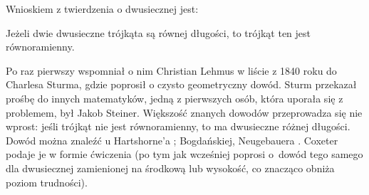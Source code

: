 %

Wnioskiem z twierdzenia o dwusiecznej jest:

\begin{theorem}
    \label{theorem_steiner_lehmus}%
	Jeżeli dwie dwusieczne trójkąta są równej długości, to trójkąt ten jest równoramienny.
\end{theorem}

Po raz pierwszy wspomniał o nim Christian Lehmus w liście z 1840 roku do Charlesa Sturma, gdzie poprosił o czysto geometryczny dowód.
%
%
Sturm przekazał prośbę do innych matematyków, jedną z pierwszych osób, która uporała się z problemem, był Jakob Steiner.
%
Większość znanych dowodów przeprowadza się nie wprost: jeśli trójkąt nie jest równoramienny, to ma dwusieczne różnej długości.
Dowód można znaleźć u Hartshorne'a \cite[s. 11]{hartshorne2000}; Bogdańskiej, Neugebauera \cite[s. 74]{neugebauer_2018}.
Coxeter \cite[s. 32]{coxeter_1967} podaje je w formie ćwiczenia (po tym jak wcześniej \cite[s. 26, 33]{coxeter_1967} poprosi o~dowód tego samego dla dwusiecznej zamienionej na środkową lub wysokość, co znacząco obniża poziom trudności).

%